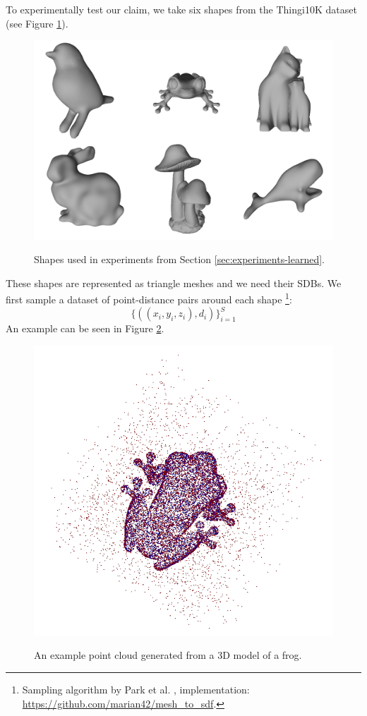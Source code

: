 \documentclass[11pt,twocolumn]{article}
\begin{document}
		To experimentally test our claim, we take six shapes from the Thingi10K dataset \cite{thingi10k}
		(see Figure \ref{fig:3dmodels}).
		\begin{figure}
			\centering
			\resizebox{0.8\textwidth}{!}
			{
				\includegraphics{all.png}
			}
			\caption
			{
				Shapes used in experiments from Section \ref{sec:experiments-learned}.
			}
			\label{fig:3dmodels}
		\end{figure}
		These shapes are represented as triangle meshes and we need their SDBs.
		We first sample a dataset of point-distance pairs around each shape
		\footnote{Sampling algorithm by Park et al. \cite{DeepShapeCVPR2019}, implementation: \url{https://github.com/marian42/mesh_to_sdf}.}:
		\begin{equation}
			\{\left((x_i, y_i, z_i), d_i\right)\}_{i=1}^S
		\end{equation}
		An example can be seen in Figure \ref{fig:ptcloud-example}.
		\begin{figure}
			\centering
			\resizebox{0.5\textwidth}{!}
			{
				\includegraphics{frogpts.png}
			}
			\caption
			{
				An example point cloud generated from a 3D model of a frog.
			}
			\label{fig:ptcloud-example}
		\end{figure}
\end{document}
